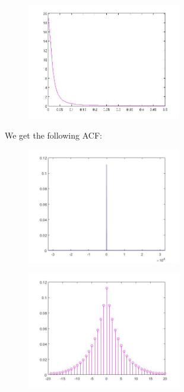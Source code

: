 \documentclass[a4paper,11pt]{article}
\begin{document}
\begin{figure}[!hp]
    \begin{center}
    \includegraphics[width=0.6\textwidth]{images/lab1_redo_figure13.jpg}
    \end{center}
\end{figure}

We get the following ACF:

\begin{figure}[!hp]
    \begin{center}
    \includegraphics[width=0.6\textwidth]{images/lab2_figure1.jpg}
    \end{center}
\end{figure}

\newpage

\begin{figure}[!hp]
    \begin{center}
    \includegraphics[width=0.6\textwidth]{images/lab2_figure4.jpg}
    \end{center}
\end{figure}
\end{document}
